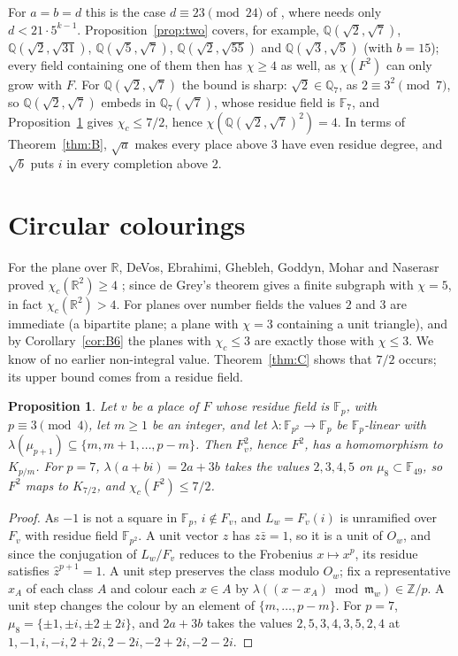 \documentclass[11pt,a4paper]{amsart}
\newtheorem{proposition}{Proposition}
\theoremstyle{remark}
\newcommand{\Q}{\mathbb{Q}}
\newcommand{\R}{\mathbb{R}}
\newcommand{\Z}{\mathbb{Z}}
\newcommand{\F}{\mathbb{F}}
\begin{document}
For $a=b=d$ this is the case $d\equiv23\pmod{24}$ of \cite[Theorem~1]{FC}, where \cite[Theorem~4(1)]{FC} needs
only $d<21\cdot5^{k-1}$. Proposition~\ref{prop:two} covers, for
example, $\Q(\sqrt2,\sqrt7)$, $\Q(\sqrt2,\sqrt{31})$, $\Q(\sqrt5,\sqrt7)$, $\Q(\sqrt2,\sqrt{55})$ and
$\Q(\sqrt3,\sqrt5)$ (with $b=15$); every field containing one of them then has $\chi\ge4$ as well, as $\chi(F^2)$
can only grow with $F$. For $\Q(\sqrt2,\sqrt7)$ the bound is sharp: $\sqrt2\in\Q_7$, as $2\equiv3^2\pmod7$, so $\Q(\sqrt2,\sqrt7)$ embeds
in $\Q_7(\sqrt7)$, whose residue field is $\F_7$, and Proposition~\ref{prop:C1} gives $\chi_c\le7/2$, hence $\chi(\Q(\sqrt2,\sqrt7)^2)=4$. In
terms of Theorem~\ref{thm:B}, $\sqrt a$
makes every place above $3$ have even residue degree, and $\sqrt b$ puts $i$ in every completion above $2$.

\section{Circular colourings}\label{sec:circ}

For the plane over $\R$, DeVos, Ebrahimi, Ghebleh, Goddyn, Mohar and Naserasr proved $\chi_c(\R^2)\ge4$
\cite{DeVos}; since de Grey's theorem gives a finite subgraph with $\chi=5$, in fact $\chi_c(\R^2)>4$. For planes over
number fields the values $2$ and $3$ are immediate (a bipartite plane; a plane with $\chi=3$ containing a unit
triangle), and by Corollary~\ref{cor:B6} the planes with $\chi_c\le3$ are exactly those with $\chi\le3$. We know of no
earlier non-integral value. Theorem~\ref{thm:C} shows that $7/2$ occurs; its upper bound comes from a residue field.

\begin{proposition}\label{prop:C1}
Let $v$ be a place of $F$ whose residue field is $\F_p$, with $p\equiv3\pmod4$, let $m\ge1$ be an integer, and let
$\lambda:\F_{p^2}\to\F_p$ be $\F_p$-linear with $\lambda(\mu_{p+1})\subseteq\{m,m+1,\dots,p-m\}$. Then $F_v^2$, hence $F^2$, has a homomorphism
to $K_{p/m}$. For $p=7$, $\lambda(a+bi)=2a+3b$ takes the values $2,3,4,5$ on $\mu_8\subset\F_{49}$, so $F^2$ maps to
$K_{7/2}$, and $\chi_c(F^2)\le7/2$.
\end{proposition}

\begin{proof}
As $-1$ is not a square in $\F_p$, $i\notin F_v$, and $L_w=F_v(i)$ is unramified over $F_v$ with residue field
$\F_{p^2}$. A unit vector $z$ has $z\bar z=1$, so it is a unit of $O_w$, and since the conjugation of $L_w/F_v$ reduces
to the Frobenius $x\mapsto x^p$, its residue satisfies $\hat z^{p+1}=1$. A unit step preserves the class modulo
$O_w$; fix a representative $x_A$ of each class $A$ and colour each $x\in A$ by
$\lambda((x-x_A)\bmod\mathfrak m_w)\in\Z/p$. A unit
step changes the colour by an element of $\{m,\dots,p-m\}$. For $p=7$, $\mu_8=\{\pm1,\pm i,\pm2\pm2i\}$, and $2a+3b$
takes the values $2,5,3,4,3,5,2,4$ at $1,-1,i,-i,2+2i,2-2i,-2+2i,-2-2i$.
\end{proof}
\end{document}
